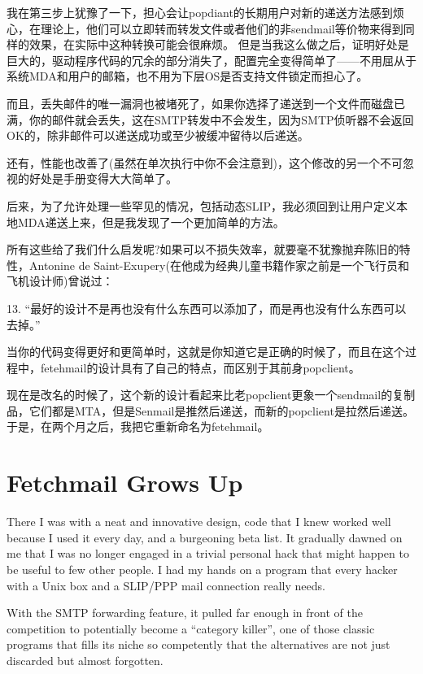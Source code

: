 \documentclass[a4paper,12pt,UTF8,twoside]{ctexbook}
\begin{document}
我在第三步上犹豫了一下，担心会让popdiant的长期用户对新的递送方法感到烦心，在理论上，他们可以立即转而转发文件或者他们的非sendmail等价物来得到同样的效果，在实际中这种转换可能会很麻烦。
但是当我这么做之后，证明好处是巨大的，驱动程序代码的冗余的部分消失了，配置完全变得简单了——不用屈从于系统MDA和用户的邮箱，也不用为下层OS是否支持文件锁定而担心了。


而且，丢失邮件的唯一漏洞也被堵死了，如果你选择了递送到一个文件而磁盘已满，你的邮件就会丢失，这在SMTP转发中不会发生，因为SMTP侦听器不会返回OK的，除非邮件可以递送成功或至少被缓冲留待以后递送。


还有，性能也改善了(虽然在单次执行中你不会注意到)，这个修改的另一个不可忽视的好处是手册变得大大简单了。


后来，为了允许处理一些罕见的情况，包括动态SLIP，我必须回到让用户定义本地MDA递送上来，但是我发现了一个更加简单的方法。


所有这些给了我们什么启发呢?如果可以不损失效率，就要毫不犹豫抛弃陈旧的特性，Antonine de Saint-Exupery(在他成为经典儿童书籍作家之前是一个飞行员和飞机设计师)曾说过：


13. “最好的设计不是再也没有什么东西可以添加了，而是再也没有什么东西可以去掉。”


当你的代码变得更好和更简单时，这就是你知道它是正确的时候了，而且在这个过程中，fetehmail的设计具有了自己的特点，而区别于其前身popclient。


现在是改名的时候了，这个新的设计看起来比老popclient更象一个sendmail的复制品，它们都是MTA，但是Senmail是推然后递送，而新的popclient是拉然后递送。于是，在两个月之后，我把它重新命名为fetehmail。

\chapter{Fetchmail Grows Up}

There I was with a neat and innovative design, code that I knew worked well because I used it every day, and a burgeoning beta list. It gradually dawned on me that I was no longer engaged in a trivial personal hack that might happen to be useful to few other people. I had my hands on a program that every hacker with a Unix box and a SLIP/PPP mail connection really needs.

With the SMTP forwarding feature, it pulled far enough in front of the competition to potentially become a ``category killer'', one of those classic programs that fills its niche so competently that the alternatives are not just discarded but almost forgotten.
\end{document}
